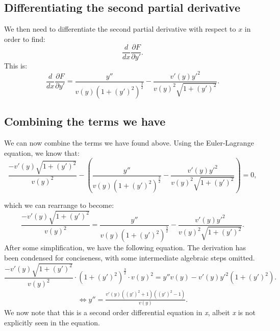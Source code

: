 \documentclass{article}
\begin{document}
\subsection{Differentiating the second partial derivative}
We then need to differentiate the second partial derivative with respect to $x$ in order to find:
\begin{equation}
    \frac{d}{dx}\frac{\partial F}{\partial y'}.
\end{equation}
This is:
\begin{equation}
    \frac{d}{dx} \frac{\partial F}{\partial y'} 
    = \frac{y''}{v\left(y\right) \left(1 + \left(y'\right)^2\right)^\frac{3}{2}} - \frac{v'\left(y\right) y'^2}{v\left(y\right)^2 \sqrt{1 + \left(y'\right)^2}}.
\end{equation}
\subsection{Combining the terms we have}
We can now combine the terms we have found above. Using the Euler-Lagrange equation, we know that:
\begin{equation}
    \frac{-v'(y) \sqrt{1+\left(y'\right)^2}}{v(y)^2} - \left( \frac{y''}{v\left(y\right) \left(1 + \left(y'\right)^2\right)^\frac{3}{2}} - \frac{v'\left(y\right) y'^2}{v\left(y\right)^2 \sqrt{1 + \left(y'\right)^2}} \right) = 0,
\end{equation}

which we can rearrange to become:
\begin{equation}
    \frac{-v'(y) \sqrt{1+\left(y'\right)^2}}{v(y)^2} = \frac{y''}{v\left(y\right) \left(1 + \left(y'\right)^2\right)^\frac{3}{2}} - \frac{v'\left(y\right) y'^2}{v\left(y\right)^2 \sqrt{1 + \left(y'\right)^2}}.
\end{equation}
After some simplification, we have the following equation. The derivation has been condensed for conciseness, with some intermediate algebraic steps omitted.
\begin{equation}
    \frac{-v'(y) \sqrt{1+\left(y'\right)^2}}{v(y)^2} \cdot \left(1 + \left(y'\right)^2\right)^\frac{3}{2} \cdot v(y)^2= y''v(y) - v'\left(y\right) y'^2 \left(1 + \left(y'\right)^2\right).
\end{equation}
\begin{align}
    \iff
    y'' = \frac{v'\left(y\right) \left(\left(y'\right)^2 + 1\right)\left(\left(y'\right)^2 - 1\right)}{v(y)}.
\end{align}
We now note that this is a second order differential equation in \textit{x}, albeit \textit{x} is not explicitly seen in the equation. 
\end{document}
